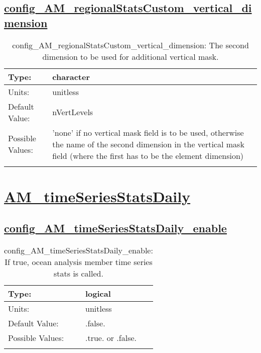 \subsection[config\_AM\_regionalStatsCustom\_vertical\_dimension]{\hyperref[sec:nm_tab_AM_regionalStatsCustom]{config\_AM\_regionalStatsCustom\_vertical\_dimension}}
\label{subsec:nm_sec_config_AM_regionalStatsCustom_vertical_dimension}
\begin{center}
\begin{longtable}{| p{2.0in} || p{4.0in} |}
    \hline
    Type: & character \\
    \hline
    Units: & \si{unitless} \\
    \hline
    Default Value: & nVertLevels \\
    \hline
    Possible Values: & 'none' if no vertical mask field is to be used, otherwise the name of the second dimension in the vertical mask field (where the first has to be the element dimension) \\
    \hline
    \caption{config\_AM\_regionalStatsCustom\_vertical\_dimension: The second dimension to be used for additional vertical mask.}
\end{longtable}
\end{center}
\section[AM\_timeSeriesStatsDaily]{\hyperref[sec:nm_tab_AM_timeSeriesStatsDaily]{AM\_timeSeriesStatsDaily}}
\label{sec:nm_sec_AM_timeSeriesStatsDaily}
\subsection[config\_AM\_timeSeriesStatsDaily\_enable]{\hyperref[sec:nm_tab_AM_timeSeriesStatsDaily]{config\_AM\_timeSeriesStatsDaily\_enable}}
\label{subsec:nm_sec_config_AM_timeSeriesStatsDaily_enable}
\begin{center}
\begin{longtable}{| p{2.0in} || p{4.0in} |}
    \hline
    Type: & logical \\
    \hline
    Units: & \si{unitless} \\
    \hline
    Default Value: & .false. \\
    \hline
    Possible Values: & .true. or .false. \\
    \hline
    \caption{config\_AM\_timeSeriesStatsDaily\_enable: If true, ocean analysis member time series stats is called.}
\end{longtable}
\end{center}
